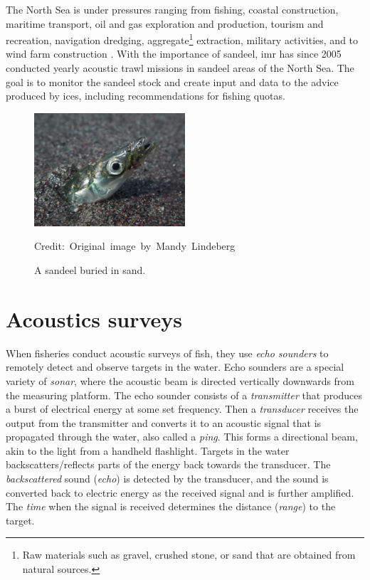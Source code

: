     The North Sea is under pressures ranging from fishing, coastal construction, maritime transport, oil and gas exploration and production, tourism and recreation, navigation dredging, aggregate\footnote{Raw materials such as gravel, crushed stone, or sand that are obtained from natural sources.} extraction, military activities, and to wind farm construction \cite{ICES2021}. With the importance of sandeel, \gls{imr} has since 2005 conducted yearly acoustic trawl missions in sandeel areas of the North Sea\cite{johnsen2017collective}. The goal is to monitor the sandeel stock and create input and data to the advice produced by \gls{ices}, including recommendations for fishing quotas\cite{sizedependentfreqrespons2009johnsen}. 
    
    \begin{figure}[H]
        \centering

        \includegraphics[width=0.5\textwidth]{figures/Ammodytes_hexapterus.jpg} 

        \caption[Sandeel]{A sandeel buried in sand.}
        \medskip 
        \hspace*{15pt}\hbox{\scriptsize Credit: Original image by Mandy Lindeberg\cite{sandeel_image}}
        \label{sandeel_image}
    \end{figure}



    
\section{Acoustics surveys}\label{acoustics}
    When fisheries conduct acoustic surveys of fish, they use \textit{echo sounders} to remotely detect and observe targets in the water. Echo sounders are a special variety of \textit{sonar}, where the acoustic beam is directed vertically downwards from the measuring platform. The echo sounder consists of a \textit{transmitter} that produces a burst of electrical energy at some set frequency. Then a \textit{transducer} receives the output from the transmitter and converts it to an acoustic signal that is propagated through the water, also called a \textit{ping}. This forms a directional beam, akin to the light from a handheld flashlight. Targets in the water backscatters/reflects parts of the energy back towards the transducer. The \textit{backscattered} sound (\textit{echo}) is detected by the transducer, and the sound is converted back to electric energy as the received signal and is further amplified. The \textit{time} when the signal is received determines the distance (\textit{range}) to the target\cite{simmonds2008fisheries}.
    
